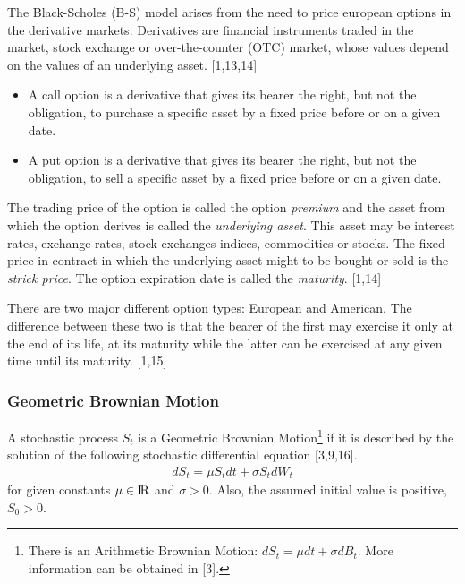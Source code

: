 \documentclass[12pt,oneside]{reedthesis}
\theoremstyle{definition}
\theoremstyle{definition}
\theoremstyle{remark}
\begin{document}
  The Black-Scholes (B-S) model arises from the need to price european
  options in the derivative markets. Derivatives are financial instruments
  traded in the market, stock exchange or over-the-counter (OTC) market,
  whose values depend on the values of an underlying asset. {[}1,13,14{]}
  \begin{itemize}
  \item
    A call option is a derivative that gives its bearer the right, but not
    the obligation, to purchase a specific asset by a fixed price before
    or on a given date.
  \item
    A put option is a derivative that gives its bearer the right, but not
    the obligation, to sell a specific asset by a fixed price before or on
    a given date.
  \end{itemize}
  The trading price of the option is called the option \emph{premium} and
  the asset from which the option derives is called the \emph{underlying
  asset}. This asset may be interest rates, exchange rates, stock
  exchanges indices, commodities or stocks. The fixed price in contract in
  which the underlying asset might to be bought or sold is the
  \emph{strick price}. The option expiration date is called the
  \emph{maturity}. {[}1,14{]}
  
  There are two major different option types: European and American. The
  difference between these two is that the bearer of the first may
  exercise it only at the end of its life, at its maturity while the
  latter can be exercised at any given time until its maturity. {[}1,15{]}
  
  \subsubsection{Geometric Brownian Motion}\label{gbm}
  
  A stochastic process \(S_t\) is a Geometric Brownian Motion\footnote{There
    is an Arithmetic Brownian Motion: \(dS_t = \mu dt + \sigma dB_t\).
    More information can be obtained in {[}3{]}.} if it is described by
  the solution of the following stochastic differential equation
  {[}3,9,16{]}.
  \begin{align}
  dS_t = \mu S_t dt + \sigma S_t dW_t
  \end{align}
  \noindent
  for given constants \(\mu \in {\rm I\!R}\) and \(\sigma > 0\). Also, the
  assumed initial value is positive, \(S_0 >0\).
  
\end{document}
